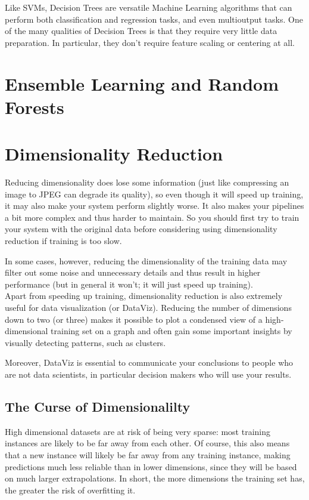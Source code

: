 \documentclass[french]{article}
\begin{document}
Like SVMs, Decision Trees are versatile Machine Learning algorithms that can perform both classification and regression tasks, and even multioutput tasks. One of the many qualities of Decision Trees is that they require very little data preparation. In particular, they don’t require feature scaling or centering at all.

\section{Ensemble Learning and Random Forests}

\section{Dimensionality Reduction}

Reducing dimensionality does lose some information (just like compressing an image to JPEG can degrade its quality), so even though it will speed up training, it may also make your system perform slightly worse. It also makes your pipelines a bit more complex and thus harder to maintain. So you should first try to train your system with the original data before considering using dimensionality reduction if training is too slow.

In some cases, however, reducing the dimensionality of the training data may filter out some noise and unnecessary details and thus result in higher performance (but in general it won’t; it will just speed up training).\\

Apart from speeding up training, dimensionality reduction is also extremely useful for data visualization (or DataViz). Reducing the number of dimensions down to two (or three) makes it possible to plot a condensed view of a high-dimensional training set on a graph and often gain some important insights by visually detecting patterns, such as clusters.

Moreover, DataViz is essential to communicate your conclusions to people who are not data scientists, in particular decision makers who will use your results.

\subsection{The Curse of Dimensionalilty}

High dimensional datasets are at risk of being very sparse: most training instances are likely to be far away from each other. Of course, this also means that a new instance will likely be far away from any training instance, making predictions much less reliable than in lower dimensions, since they will be based on much larger extrapolations.  In short, the more dimensions the training set has, the greater the risk of overfitting it.\\
\end{document}

